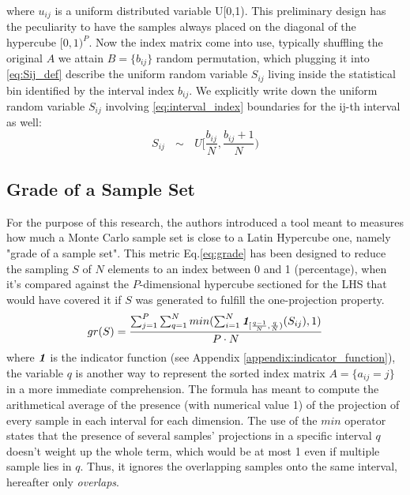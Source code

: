 \documentclass[12pt]{article}
\newcommand{\meqref}[1]{Eq.\ref{#1}}
\newcommand{\mappendixref}[1]{Appendix \ref{#1}}
\newcommand{\indfunc}[1]{\textit{\textbf{1}}_{#1}}
\begin{document}
where $u_{ij}$ is a uniform distributed variable U[0,1). This preliminary design has the peculiarity to have the samples always placed on the diagonal of the hypercube $[0,1)^P$. Now the index matrix come into use, typically shuffling the original $A$ we attain $B = \{b_{ij}\}$ random permutation, which plugging it  into \cref{eq:Sij_def} describe the uniform random variable $S_{ij}$ living inside the statistical bin identified by the interval index $b_{ij}$. We explicitly write down the uniform random variable $S_{ij}$ involving \cref{eq:interval_index} boundaries for the ij-th interval as well: 
\begin{equation}
\label{eq:rand_variable_Sij}
S_{ij} \text{ $\sim$ } U[\frac{b_{ij}}{N}, \frac{b_{ij} + 1}{N})
\end{equation}

\subsection{Grade of a Sample Set}
\label{subsec:lhs_grade}
For the purpose of this research, the authors introduced a tool meant to measures how much a Monte Carlo sample set is close to a Latin Hypercube one, namely "grade of a sample set". This metric \meqref{eq:grade} has been designed to reduce the sampling $S$ of $N$ elements to an index between 0 and 1 (percentage), when it's compared against the $P$-dimensional hypercube sectioned for the LHS that would have covered it if $S$ was generated to fulfill the one-projection property.
\begin{equation}
\label{eq:grade}
gr(S) = \frac{\sum^P_{j=1}\sum^N_{q=1} min(\sum^N_{i=1}\indfunc{[\frac{q-1}{N}, \frac{q}{N})}(S_{ij}), 1)}{P \cdot N}
\end{equation}
where $\indfunc{}$ is the indicator function (see \mappendixref{appendix:indicator_function}), the variable $q$ is another way to represent the sorted index matrix $A = \{a_{ij} = j \}$ in a more immediate comprehension. The formula has meant to compute the arithmetical average of the presence (with numerical value 1) of the projection of every sample in each interval for each dimension. The use of the $min$ operator states that the presence of several samples' projections in a specific interval $q$ doesn't weight up the whole term, which would be at most 1 even if multiple sample lies in $q$. Thus, it ignores the overlapping samples onto the same interval, hereafter only \textit{overlaps}.
\end{document}

